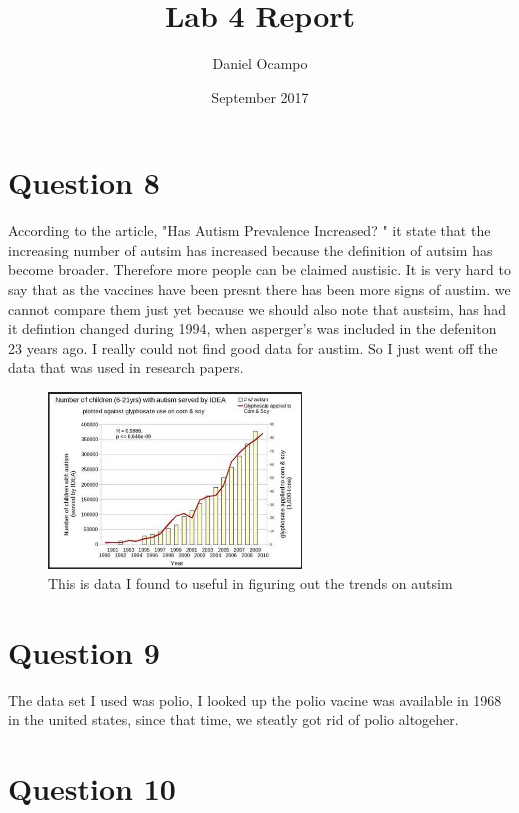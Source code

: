 \documentclass{article}
\title{Lab 4 Report}
\author{Daniel  Ocampo}
\date{September 2017}
\begin{document}
\maketitle



\section{Question 8}

According to the article, "Has Autism Prevalence Increased? " it state that the increasing number of autsim has increased because the definition of autsim has become broader. Therefore more people can be claimed austisic. It is very hard to say that as the vaccines have been presnt there has been more signs of austim. we cannot compare them just yet because we should also note that austsim, has had it defintion changed during 1994, when asperger's was included in the defeniton 23 years ago. I really could not find good data for austim. So I just went off the data that was used in research papers.




 

\begin{figure}
\caption{This is data I found to useful in figuring out the trends on autsim }
\includegraphics[width=0.6\textwidth]{data}
\end{figure}





\section{Question 9}

The data set  I used was polio, I looked up the polio vacine was available in 1968 in the united states, since that time, we steatly got rid of polio altogeher. 




\section{Question 10}
\end{document}
